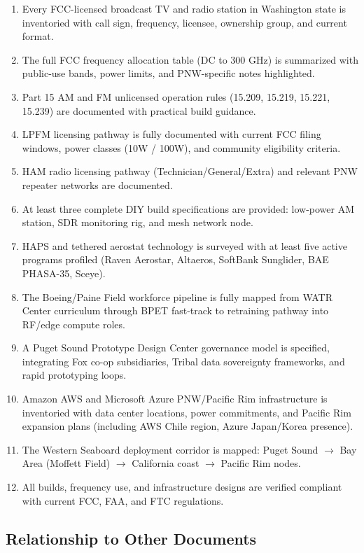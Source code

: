 \documentclass[11pt,letterpaper]{article}
\begin{document}
\begin{enumerate}
  \item Every FCC-licensed broadcast TV and radio station in Washington state is inventoried with call sign, frequency, licensee, ownership group, and current format.
  \item The full FCC frequency allocation table (DC to 300 GHz) is summarized with public-use bands, power limits, and PNW-specific notes highlighted.
  \item Part 15 AM and FM unlicensed operation rules (15.209, 15.219, 15.221, 15.239) are documented with practical build guidance.
  \item LPFM licensing pathway is fully documented with current FCC filing windows, power classes (10W / 100W), and community eligibility criteria.
  \item HAM radio licensing pathway (Technician/General/Extra) and relevant PNW repeater networks are documented.
  \item At least three complete DIY build specifications are provided: low-power AM station, SDR monitoring rig, and mesh network node.
  \item HAPS and tethered aerostat technology is surveyed with at least five active programs profiled (Raven Aerostar, Altaeros, SoftBank Sunglider, BAE PHASA-35, Sceye).
  \item The Boeing/Paine Field workforce pipeline is fully mapped from WATR Center curriculum through BPET fast-track to retraining pathway into RF/edge compute roles.
  \item A Puget Sound Prototype Design Center governance model is specified, integrating Fox co-op subsidiaries, Tribal data sovereignty frameworks, and rapid prototyping loops.
  \item Amazon AWS and Microsoft Azure PNW/Pacific Rim infrastructure is inventoried with data center locations, power commitments, and Pacific Rim expansion plans (including AWS Chile region, Azure Japan/Korea presence).
  \item The Western Seaboard deployment corridor is mapped: Puget Sound $\to$ Bay Area (Moffett Field) $\to$ California coast $\to$ Pacific Rim nodes.
  \item All builds, frequency use, and infrastructure designs are verified compliant with current FCC, FAA, and FTC regulations.
\end{enumerate}

\subsection{Relationship to Other Documents}
\end{document}
